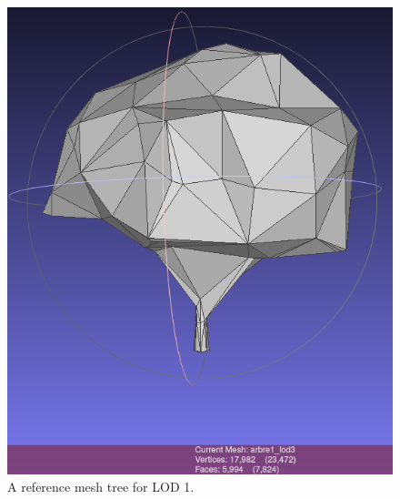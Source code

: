 \documentclass[12pt]{article}
\begin{document}
\begin{figure}[H]
\begin{minipage}{0.45\textwidth}
    \end{minipage}\hfill
    \begin{minipage}{0.45\textwidth}
        \centering
        \includegraphics[width=\textwidth]{images/lod1.png}
        \caption{A reference mesh tree for LOD 1.}
    \end{minipage}
\end{figure}
\end{document}
